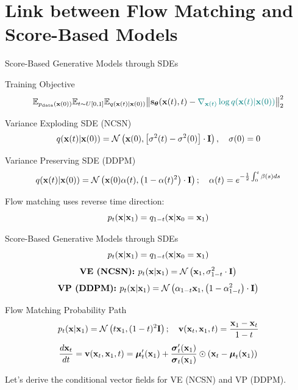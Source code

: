 \documentclass{beamer}
\begin{document}
\section{Link between Flow Matching and Score-Based Models}
\begin{frame}{Score-Based Generative Models through SDEs}
	\vspace{-0.3cm}
	\begin{block}{Training Objective}
		\vspace{-0.7cm}
		\[
			\mathbb{E}_{p_{\text{data}}(\mathbf{x}(0))} \mathbb{E}_{t \sim U[0, 1]} \mathbb{E}_{q(\mathbf{x}(t) | \mathbf{x}(0))}\bigl\| \mathbf{s}_{\boldsymbol{\theta}}(\mathbf{x}(t), t) - {\color{teal}\nabla_{\mathbf{x}(t)} \log q(\mathbf{x}(t) | \mathbf{x}(0))} \bigr\|^2_2
		\]
		\vspace{-0.5cm}
	\end{block}
	\eqpause
	\begin{block}{Variance Exploding SDE (NCSN)}
		\vspace{-0.3cm}
		\[
			q(\mathbf{x}(t) | \mathbf{x}(0)) = \mathcal{N}\left(\mathbf{x}(0), \left[\sigma^2(t) - \sigma^2(0)\right] \cdot \mathbf{I}\right), \quad \sigma(0) =0
		\]
		\vspace{-0.5cm}
	\end{block}
	\begin{block}{Variance Preserving SDE (DDPM)}
		\vspace{-0.5cm}
		\[
			q(\mathbf{x}(t) | \mathbf{x}(0)) = \mathcal{N}\left(\mathbf{x}(0) \alpha(t), \left(1 - \alpha(t)^2\right) \cdot \mathbf{I}\right); \quad \alpha(t) = e^{-\frac{1}{2} \int_0^t \beta(s) ds}
		\]
		\vspace{-0.5cm}
	\end{block}
	\eqpause
	Flow matching uses reverse time direction:
	\[
		p_t(\mathbf{x}| \mathbf{x}_1) = q_{1-t}(\mathbf{x}| \mathbf{x}_0=\mathbf{x}_1)
	\]
\end{frame}
\begin{frame}{Score-Based Generative Models through SDEs}
	\[
		p_t(\mathbf{x}| \mathbf{x}_1) = q_{1-t}(\mathbf{x}| \mathbf{x}_0=\mathbf{x}_1)
	\]
	\[
		\textbf{VE (NCSN): } p_t(\mathbf{x} | \mathbf{x}_1) = \mathcal{N}\left(\mathbf{x}_1, \sigma^2_{1-t} \cdot \mathbf{I}\right)
	\]
	\vspace{-0.5cm}
	\[
		\textbf{VP (DDPM): } p_t(\mathbf{x} | \mathbf{x}_1) = \mathcal{N}\left(\alpha_{1-t} \mathbf{x}_1, \left(1 - \alpha_{1-t}^2\right) \cdot \mathbf{I}\right)
	\]
	\vspace{-0.5cm}
	\eqpause
	\begin{block}{Flow Matching Probability Path}
		\vspace{-0.3cm}
		\[
			p_t(\mathbf{x} | \mathbf{x}_1) = \mathcal{N}\left(t \mathbf{x}_1, (1-t)^2 \mathbf{I}\right); \quad \mathbf{v}(\mathbf{x}_t, \mathbf{x}_1, t) = \frac{\mathbf{x}_1  - \mathbf{x}_t}{1-t}
		\]
		\vspace{-0.3cm}
		\[
	 		\frac{d\mathbf{x}_t}{dt} = \mathbf{v}(\mathbf{x}_t, \mathbf{x}_1, t) =  \boldsymbol{\mu}_t'(\mathbf{x}_1) + \frac{\boldsymbol{\sigma}_t'(\mathbf{x}_1)}{\boldsymbol{\sigma}_t(\mathbf{x}_1)} \odot (\mathbf{x}_t - \boldsymbol{\mu}_t(\mathbf{x}_1))
		\]
	\end{block}
	\eqpause
	Let's derive the conditional vector fields for VE (NCSN) and VP (DDPM).
\end{frame}
\end{document}
